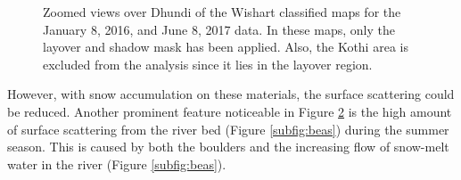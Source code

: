 \documentclass[12pt]{elsarticle}
\numberwithin{equation}{section}
\numberwithin{figure}{section}
\numberwithin{table}{section}
\begin{document}
\begin{figure}[!ht]
    \centering
    \begin{subfigure}[t]{\textwidth}
        \caption{}
        \label{subfig:wishart_jan}
    \end{subfigure}
    \begin{subfigure}[t]{\textwidth}
        \caption{}
        \label{subfig:wishart_jun}
    \end{subfigure}
    \caption{\doublespacing Zoomed views over Dhundi of the Wishart classified maps for the  January 8, 2016, and  June 8, 2017 data. In these maps, only the layover and shadow mask has been applied. Also, the Kothi area is excluded from the analysis since it lies in the layover region.}
    \label{fig:wishart_res}
\end{figure}

However, with snow accumulation on these materials, the surface scattering could be reduced. Another prominent feature noticeable in Figure \ref{subfig:wishart_jun} is the high amount of surface scattering from the river bed (Figure \ref{subfig:beas}) during the summer season. This is caused by both the boulders and the increasing flow of snow-melt water in the river (Figure \ref{subfig:beas}).
\end{document}
